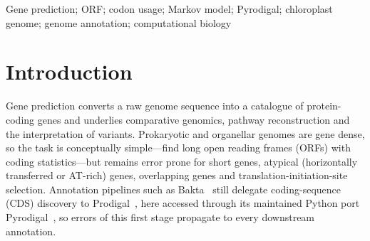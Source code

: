 \begin{abstract}
Accurate ab initio gene prediction is the first step of genome annotation, yet widely used self-training gene finders such as Prodigal and its Python port Pyrodigal are tuned for bacterial chromosomes and can degrade on short, AT-rich or organellar genomes. We (i) benchmark Pyrodigal in its single-genome (self-trained) and metagenomic modes against RefSeq annotation on three real, fully annotated genomes (the 154~kb \textit{Arabidopsis thaliana} chloroplast, the \textit{Yersinia pestis} plasmid pPCP1 and phage phiX174), and (ii) propose \emph{CodonRescore}, a lightweight, annotation-free post-processor that re-scores every gene call with a 3-periodic order-2 Markov codon model trained on the genome's own long ORFs, with a decision threshold obtained from a cross-fitted comparison of seed ORFs against shadow-frame ORFs. On the chloroplast genome, self-trained Pyrodigal calls 43 false genes (precision 0.574, F1 0.678); CodonRescore prunes 38 calls (35 of them false) and raises precision to 0.778 and F1 to 0.789 at a cost of 2 true genes. Applied to Pyrodigal's metagenomic mode, which is already strong (F1 0.841), CodonRescore does not help (F1 0.816; bootstrap intervals overlap). A 2.46~Mb \textit{Corynebacterium diphtheriae} genome shows the method scales and behaves consistently (45 pruned, 69 rescued calls, all short). We discuss the limits of this small benchmark and outline extensions using protein language models.
\end{abstract}

\begin{keywords}
Gene prediction; ORF; codon usage; Markov model; Pyrodigal; chloroplast genome; genome annotation; computational biology
\end{keywords}

\section{Introduction}
Gene prediction converts a raw genome sequence into a catalogue of protein-coding genes and underlies comparative genomics, pathway reconstruction and the interpretation of variants. Prokaryotic and organellar genomes are gene dense, so the task is conceptually simple---find long open reading frames (ORFs) with coding statistics---but remains error prone for short genes, atypical (horizontally transferred or AT-rich) genes, overlapping genes and translation-initiation-site selection. Annotation pipelines such as Bakta~\cite{schwengers2021} still delegate coding-sequence (CDS) discovery to Prodigal~\cite{hyatt2010}, here accessed through its maintained Python port Pyrodigal~\cite{larralde2022}, so errors of this first stage propagate to every downstream annotation.

